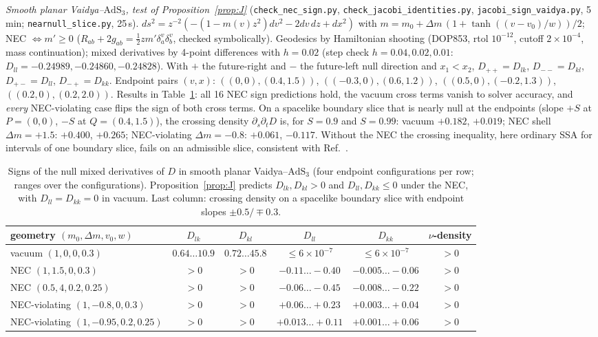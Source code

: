 \documentclass[aps,prd,onecolumn,superscriptaddress,nofootinbib,amsmath,amssymb,11pt]{revtex4-2}
\theoremstyle{definition}
\newcommand{\AdS}{\mathrm{AdS}_3}
\begin{document}
\begin{sloppypar}
\emph{Smooth planar Vaidya--$\AdS$, test of Proposition~\ref{prop:J}} (\texttt{check\_nec\_sign.py}, \texttt{check\_jacobi\_identities.py},
\texttt{jacobi\_sign\_vaidya.py}, 5\,min; \texttt{nearnull\_slice.py}, 25\,s). $ds^2=z^{-2}(-(1-m(v)z^2)dv^2-2dv\,dz+dx^2)$ with
$m=m_0+\Delta m\,(1+\tanh((v-v_0)/w))/2$; NEC $\Leftrightarrow m'\ge0$ ($R_{ab}+2g_{ab}=\frac12zm'\delta^v_a\delta^v_b$, checked symbolically).
Geodesics by Hamiltonian shooting (DOP853, rtol $10^{-12}$, cutoff $2\times10^{-4}$, mass continuation); mixed derivatives by 4-point
differences with $h=0.02$ (step check $h=0.04,0.02,0.01$: $D_{ll}=-0.24989,-0.24860,-0.24828$). With $+$ the future-right and $-$ the
future-left null direction and $x_1<x_2$, $D_{++}=D_{lk}$, $D_{--}=D_{kl}$, $D_{+-}=D_{ll}$, $D_{-+}=D_{kk}$. Endpoint pairs
$(v,x)$: $((0,0),(0.4,1.5))$, $((-0.3,0),(0.6,1.2))$, $((0.5,0),(-0.2,1.3))$, $((0.2,0),(0.2,2.0))$. Results in
Table~\ref{tab:jacobi}: all 16 NEC sign predictions hold, the vacuum cross terms vanish to solver accuracy, and \emph{every}
NEC-violating case flips the sign of both cross terms. On a spacelike boundary slice that is nearly null at the endpoints (slope
$+S$ at $P=(0,0)$, $-S$ at $Q=(0.4,1.5)$), the crossing density $\partial_s\partial_tD$ is, for $S=0.9$ and $S=0.99$: vacuum $+0.182$, $+0.019$;
NEC shell $\Delta m=+1.5$: $+0.400$, $+0.265$; NEC-violating $\Delta m=-0.8$: $+0.061$, $\mathbf{-0.117}$. Without the NEC the crossing
inequality, here ordinary SSA for intervals of one boundary slice, fails on an admissible slice, consistent with
Ref.~\cite{CallanHeHeadrick2012}.
\end{sloppypar}

\begin{table}[h]
\caption{Signs of the null mixed derivatives of $D$ in smooth planar Vaidya--$\AdS$ (four endpoint configurations per row;
ranges over the configurations). Proposition~\ref{prop:J} predicts $D_{lk},D_{kl}>0$ and $D_{ll},D_{kk}\le0$ under the NEC, with
$D_{ll}=D_{kk}=0$ in vacuum. Last column: crossing density on a spacelike boundary slice with endpoint slopes $\pm0.5/\mp0.3$.}
\label{tab:jacobi}
\begin{ruledtabular}
\begin{tabular}{lccccc}
geometry $(m_0,\Delta m,v_0,w)$ & $D_{lk}$ & $D_{kl}$ & $D_{ll}$ & $D_{kk}$ & $\nu$-density\\
\hline
vacuum $(1,0,0,0.3)$ & $0.64\dots10.9$ & $0.72\dots45.8$ & $\le6\times10^{-7}$ & $\le6\times10^{-7}$ & $>0$\\
NEC $(1,1.5,0,0.3)$ & $>0$ & $>0$ & $-0.11\dots-0.40$ & $-0.005\dots-0.06$ & $>0$\\
NEC $(0.5,4,0.2,0.25)$ & $>0$ & $>0$ & $-0.06\dots-0.45$ & $-0.008\dots-0.22$ & $>0$\\
NEC-violating $(1,-0.8,0,0.3)$ & $>0$ & $>0$ & $+0.06\dots+0.23$ & $+0.003\dots+0.04$ & $>0$\\
NEC-violating $(1,-0.95,0.2,0.25)$ & $>0$ & $>0$ & $+0.013\dots+0.11$ & $+0.001\dots+0.06$ & $>0$\\
\end{tabular}
\end{ruledtabular}
\end{table}
\end{document}
